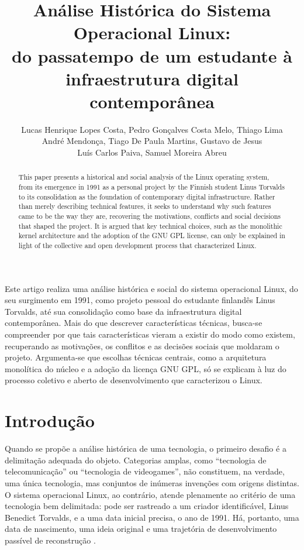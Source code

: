 \documentclass[12pt]{article}
\title{Análise Histórica do Sistema Operacional Linux:\\ do passatempo de um estudante à infraestrutura digital contemporânea}
\author{Lucas Henrique Lopes Costa\inst{1}, Pedro Gonçalves Costa Melo\inst{1},
  Thiago Lima\inst{1} \\
  André Mendonça\inst{1}, Tiago De Paula Martins\inst{1}, Gustavo de Jesus\inst{1} \\
  Luís Carlos Paiva\inst{1}, Samuel Moreira Abreu\inst{1} }
\begin{document}
\maketitle

\begin{abstract}
  This paper presents a historical and social analysis of the Linux operating
  system, from its emergence in 1991 as a personal project by the Finnish
  student Linus Torvalds to its consolidation as the foundation of contemporary
  digital infrastructure. Rather than merely describing technical features, it
  seeks to understand why such features came to be the way they are, recovering
  the motivations, conflicts and social decisions that shaped the project. It is
  argued that key technical choices, such as the monolithic kernel architecture
  and the adoption of the GNU GPL license, can only be explained in light of the
  collective and open development process that characterized Linux.
\end{abstract}

\begin{resumo}
  Este artigo realiza uma análise histórica e social do sistema operacional
  Linux, do seu surgimento em 1991, como projeto pessoal do estudante finlandês
  Linus Torvalds, até sua consolidação como base da infraestrutura digital
  contemporânea. Mais do que descrever características técnicas, busca-se
  compreender por que tais características vieram a existir do modo como existem,
  recuperando as motivações, os conflitos e as decisões sociais que moldaram o
  projeto. Argumenta-se que escolhas técnicas centrais, como a arquitetura
  monolítica do núcleo e a adoção da licença GNU GPL, só se explicam à luz do
  processo coletivo e aberto de desenvolvimento que caracterizou o Linux.
\end{resumo}

\section{Introdução}

Quando se propõe a análise histórica de uma tecnologia, o primeiro desafio é a
delimitação adequada do objeto. Categorias amplas, como ``tecnologia de
telecomunicação'' ou ``tecnologia de videogames'', não constituem, na verdade,
uma única tecnologia, mas conjuntos de inúmeras invenções com origens distintas.
O sistema operacional Linux, ao contrário, atende plenamente ao critério de uma
tecnologia bem delimitada: pode ser rastreado a um criador identificável, Linus
Benedict Torvalds, e a uma data inicial precisa, o ano de 1991. Há, portanto,
uma data de nascimento, uma ideia original e uma trajetória de desenvolvimento
passível de reconstrução \cite{moody2001}.
\end{document}
